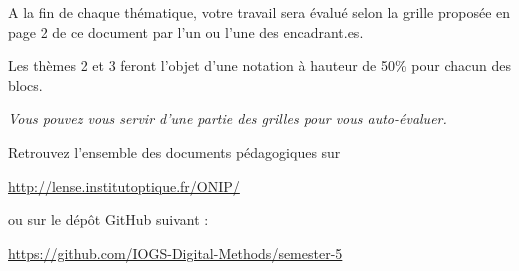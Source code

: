 \documentclass[10pt]{article} %
\begin{document}
\begin{minipage}[t]{.60\linewidth}
\bigskip


\begin{mdframed}[style=aavbox,frametitle={Evaluation du module}]
A la fin de chaque thématique, votre travail sera évalué selon la grille proposée en page 2 de ce document par l'un ou l'une des encadrant.es. 

Les thèmes 2 et 3 feront l'objet d'une notation à hauteur de 50\% pour chacun des blocs.

\textit{Vous pouvez vous servir d'une partie des grilles pour vous auto-évaluer.}
\end{mdframed}



\end{minipage} %

\bigskip

\begin{center}
	\Large Retrouvez l'ensemble des documents pédagogiques sur
	
	\href{http://lense.institutoptique.fr/ONIP/}{http://lense.institutoptique.fr/ONIP/}
	
	\medskip
	
	\large	
	
	ou sur le dépôt GitHub suivant :
	
	\href{https://github.com/IOGS-Digital-Methods/semester-5}{https://github.com/IOGS-Digital-Methods/semester-5}
\end{center}





\end{document}
